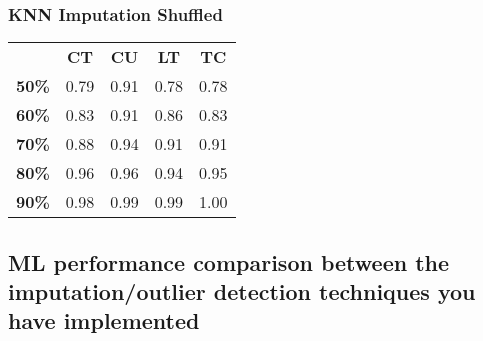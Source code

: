 \documentclass{article}
\begin{document}
\subsubsection{KNN Imputation Shuffled}
\begin{table}[h]
\begin{tabular}{ccccc}
              & \textbf{CT} & \textbf{CU} & \textbf{LT} & \textbf{TC} \\
\textbf{50\%} & 0.79        & 0.91        & 0.78        & 0.78        \\
\textbf{60\%} & 0.83        & 0.91        & 0.86        & 0.83        \\
\textbf{70\%} & 0.88        & 0.94        & 0.91        & 0.91        \\
\textbf{80\%} & 0.96        & 0.96        & 0.94        & 0.95        \\
\textbf{90\%} & 0.98        & 0.99        & 0.99        & 1.00       
\end{tabular}
\end{table}

\subsection{ML performance comparison between the imputation/outlier detection techniques you have implemented}
\end{document}
